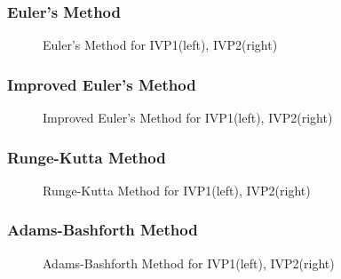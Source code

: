 \documentclass[UTF8]{beamer}
\begin{document}

\begin{frame}
\frametitle{Euler's Method}
	\begin{figure}
		\centering
		\scalebox{0.3}{}
		\scalebox{0.3}{}
		\caption{Euler's Method for IVP1(left), IVP2(right)}
	\end{figure}
\end{frame}	

\begin{frame}
	\frametitle{Improved Euler's Method}
	\begin{figure}
		\centering
		\scalebox{0.3}{}
		\scalebox{0.3}{}
		\caption{Improved Euler's Method for IVP1(left), IVP2(right)}
	\end{figure}
\end{frame}	

\begin{frame}
	\frametitle{Runge-Kutta Method}
	\begin{figure}
		\centering
		\scalebox{0.3}{}
		\scalebox{0.3}{}
		\caption{Runge-Kutta Method for IVP1(left), IVP2(right)}
	\end{figure}
\end{frame}

\begin{frame}
	\frametitle{Adams-Bashforth Method}
	\begin{figure}
		\centering
		\scalebox{0.3}{}
		\scalebox{0.3}{}
		\caption{Adams-Bashforth Method for IVP1(left), IVP2(right)}
	\end{figure}
\end{frame}	
\end{document}
